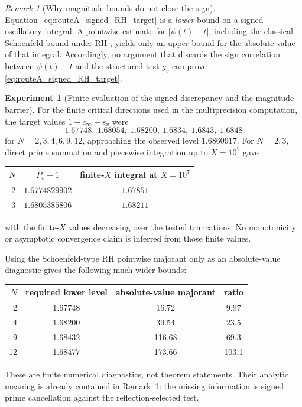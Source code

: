 \documentclass[11pt]{amsart}
\numberwithin{equation}{section}
\theoremstyle{plain}
\theoremstyle{definition}
\newtheorem{experiment}[theorem]{Experiment}
\theoremstyle{remark}
\newtheorem{remark}[theorem]{Remark}
\begin{document}
\begin{remark}[Why magnitude bounds do not close the sign]
\label{rem:routeA_size_wrong_direction}
Equation~\eqref{eq:routeA_signed_RH_target} is a \emph{lower} bound on a signed oscillatory
integral.  A pointwise estimate for \(|\psi(t)-t|\), including the classical Schoenfeld bound under
RH \cite{Schoenfeld1976}, yields only an upper bound for the absolute value of that integral.
Accordingly, no argument that discards the sign correlation between \(\psi(t)-t\) and the structured
test \(g_v\) can prove \eqref{eq:routeA_signed_RH_target}.
\end{remark}

\begin{experiment}[Finite evaluation of the signed discrepancy and the magnitude barrier]
\label{exp:routeA_signed_discrepancy}
For the finite critical directions used in the multiprecision computation, the target values
\(1-c_\infty-s_v\) were
\[
1.67748,\ 1.68054,\ 1.68200,\ 1.6834,\ 1.6843,\ 1.6848
\]
for \(N=2,3,4,6,9,12\), approaching the observed level \(1.6860917\).
For \(N=2,3\), direct prime summation and piecewise integration up to \(X=10^7\) gave
\begin{center}
\small
\begin{tabular}{rcc}
\toprule
\(N\)&\(P_v+1\)&finite-\(X\) integral at \(X=10^7\)\\
\midrule
2&\(1.6774829902\)&\(1.67851\)\\
3&\(1.6805385806\)&\(1.68211\)\\
\bottomrule
\end{tabular}
\end{center}
with the finite-\(X\) values decreasing over the tested truncations.  No monotonicity or
asymptotic convergence claim is inferred from those finite values.

Using the Schoenfeld-type RH pointwise majorant only as an absolute-value diagnostic gives the
following much wider bounds:
\begin{center}
\small
\begin{tabular}{rccc}
\toprule
\(N\)&required lower level&absolute-value majorant&ratio\\
\midrule
2&1.67748&16.72&9.97\\
4&1.68200&39.54&23.5\\
9&1.68432&116.68&69.3\\
12&1.68477&173.66&103.1\\
\bottomrule
\end{tabular}
\end{center}
These are finite numerical diagnostics, not theorem statements.  Their analytic meaning is already
contained in Remark~\ref{rem:routeA_size_wrong_direction}: the missing information is signed
prime cancellation against the reflection-selected test.
\end{experiment}
\end{document}
